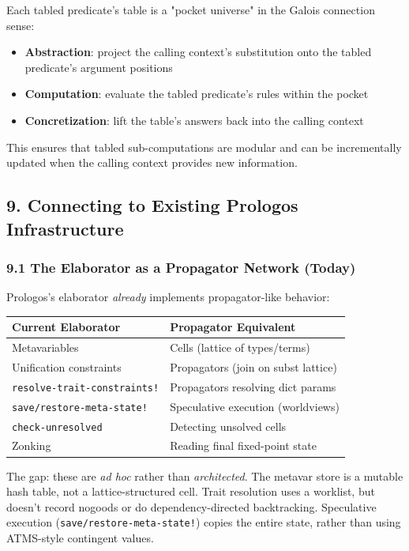\documentclass[11pt]{article}
\begin{document}
Each tabled predicate's table is a "pocket universe" in the Galois
connection sense:

\begin{itemize}
\item \textbf{Abstraction}: project the calling context's substitution onto the
tabled predicate's argument positions
\item \textbf{Computation}: evaluate the tabled predicate's rules within the pocket
\item \textbf{Concretization}: lift the table's answers back into the calling context
\end{itemize}

This ensures that tabled sub-computations are modular and can be
incrementally updated when the calling context provides new information.
\subsection{9. Connecting to Existing Prologos Infrastructure}
\label{sec:org8a52c01}

\subsubsection{9.1 The Elaborator as a Propagator Network (Today)}
\label{sec:org982298b}

Prologos's elaborator \emph{already} implements propagator-like behavior:

\begin{center}
\begin{tabular}{ll}
Current Elaborator & Propagator Equivalent\\
\hline
Metavariables & Cells (lattice of types/terms)\\
Unification constraints & Propagators (join on subst lattice)\\
\texttt{resolve-trait-constraints!} & Propagators resolving dict params\\
\texttt{save/restore-meta-state!} & Speculative execution (worldviews)\\
\texttt{check-unresolved} & Detecting unsolved cells\\
Zonking & Reading final fixed-point state\\
\end{tabular}
\end{center}

The gap: these are \emph{ad hoc} rather than \emph{architected}. The metavar store
is a mutable hash table, not a lattice-structured cell. Trait resolution
uses a worklist, but doesn't record nogoods or do dependency-directed
backtracking. Speculative execution (\texttt{save/restore-meta-state!}) copies
the entire state, rather than using ATMS-style contingent values.
\end{document}
